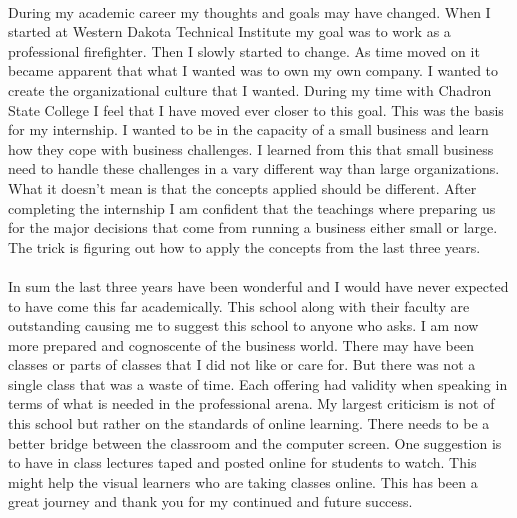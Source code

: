 \documentclass[12pt,titlepage]{article}
\begin{document}
\paragraph {}
During my academic career my thoughts and goals may have changed. When I started at Western Dakota Technical Institute my goal was to work as a professional firefighter. Then I slowly started to change. As time moved on it became apparent that what I wanted was to own my own company. I wanted to create the organizational culture that I wanted. During my time with Chadron State College I feel that I have moved ever closer to this goal. This was the basis for my internship. I wanted to be in the capacity of a small business and learn how they cope with business challenges. I learned from this that small business need to handle these challenges in a vary different way than large organizations. What it doesn't mean is that the concepts applied should be different. After completing the internship I am confident that the teachings where preparing us for the major decisions that come from running a business either small or large. The trick is figuring out how to apply the concepts from the last three years.
\paragraph {}
In sum the last three years have been wonderful and I would have never expected to have come this far academically. This school along with their faculty are outstanding causing me to suggest this school to anyone who asks. I am now more prepared and cognoscente of the business world. There may have been classes or parts of classes that I did not like or care for. But there was not a single class that was a waste of time. Each offering had validity when speaking in terms of what is needed in the professional arena. My largest criticism is not of this school but rather on the standards of online learning. There needs to be a better bridge between the classroom and the computer screen. One suggestion is to have in class lectures taped and posted online for students to watch. This might help the visual learners who are taking classes online. This has been a great journey and thank you for my continued and future success.
\end{document}
